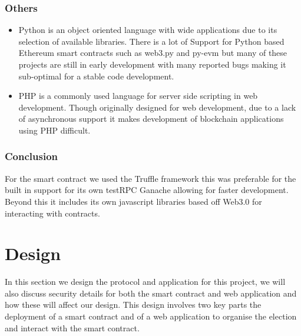 \documentclass{entcs}
\begin{document}
\subsubsection{Others}
\begin{itemize}
    \item Python is an object oriented language with wide applications due to its selection of available libraries. There is a lot of Support for Python based Ethereum smart contracts such as web3.py and py-evm but many of these projects are still in early development with many reported bugs making it sub-optimal for a stable code development.
    \item PHP is a commonly used language for server side scripting in web development. Though originally designed for web development, due to a lack of asynchronous support it makes development of blockchain applications using PHP difficult.
\end{itemize}

\subsubsection{Conclusion}
For the smart contract we used the Truffle framework this was preferable for the built in support for its own testRPC Ganache allowing for faster development. Beyond this it includes its own javascript libraries based off Web3.0 for interacting with contracts.

\section{Design} \label{sec: Design}
In this section we design the protocol and application for this project, we will also discuss security details for both the smart contract and web application and how these will affect our design. This design involves two key parts the deployment of a smart contract and of a web application to organise the election and interact with the smart contract.
\end{document}
